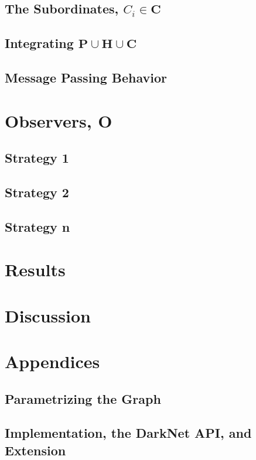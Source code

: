 \documentclass{article}
\newcommand{\Hub}[0]{\ensuremath{\mathbf{H}}}
\newcommand{\Obs}[0]{\ensuremath{\mathbf{O}}}
\begin{document}
\subsection*{The Subordinates, $C_i\in\mathbf{C}$}

\subsection*{Integrating $\mathbf{P}\cup\Hub\cup\mathbf{C}$}

\subsection*{Message Passing Behavior}

\section*{Observers, \Obs}

\subsection*{Strategy 1}

\subsection*{Strategy 2}

\subsection*{Strategy n}

\section*{Results}

\section*{Discussion}

\section*{Appendices}

\subsection*{Parametrizing the Graph}

\subsection*{Implementation, the DarkNet API, and Extension}
\end{document}
